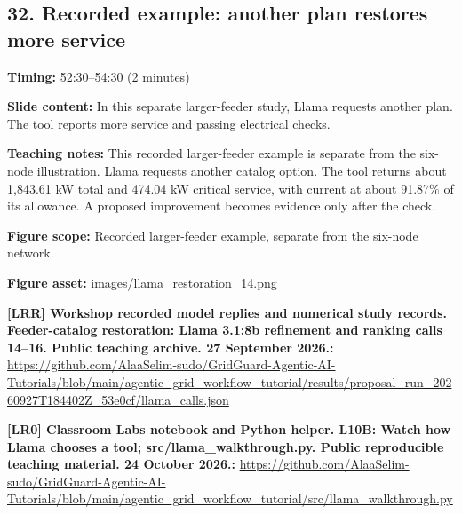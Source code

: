 \documentclass[10pt,letterpaper]{article}
\begin{document}
\subsection*{32. Recorded example: another plan restores more service}
\textbf{Timing:} 52:30--54:30 (2 minutes)\par
\textbf{Slide content:} In this separate larger-feeder study, Llama requests another plan.
The tool reports more service and passing electrical checks.\par
\textbf{Teaching notes:} This recorded larger-feeder example is separate from the six-node illustration. Llama requests another catalog option. The tool returns about 1,843.61 kW total and 474.04 kW critical service, with current at about 91.87\% of its allowance. A proposed improvement becomes evidence only after the check.\par
\textbf{Figure scope:} Recorded larger-feeder example, separate from the six-node network.\par
\textbf{Figure asset:} images/llama\_restoration\_14.png\par
\textbf{[LRR] Workshop recorded model replies and numerical study records. Feeder-catalog restoration: Llama 3.1:8b refinement and ranking calls 14--16. Public teaching archive. 27 September 2026.:} \href{https://github.com/AlaaSelim-sudo/GridGuard-Agentic-AI-Tutorials/blob/main/agentic_grid_workflow_tutorial/results/proposal_run_20260927T184402Z_53e0cf/llama_calls.json}{\small\ttfamily https:/\allowbreak{}/\allowbreak{}github.\allowbreak{}com/\allowbreak{}AlaaSelim-\allowbreak{}sudo/\allowbreak{}GridGuard-\allowbreak{}Agentic-\allowbreak{}AI-\allowbreak{}Tutorials/\allowbreak{}blob/\allowbreak{}main/\allowbreak{}agentic\_\allowbreak{}grid\_\allowbreak{}workflow\_\allowbreak{}tutorial/\allowbreak{}results/\allowbreak{}proposal\_\allowbreak{}run\_\allowbreak{}20260927T184402Z\_\allowbreak{}53e0cf/\allowbreak{}llama\_\allowbreak{}calls.\allowbreak{}json}\par
\textbf{[LR0] Classroom Labs notebook and Python helper. L10B: Watch how Llama chooses a tool; src/llama\_walkthrough.py. Public reproducible teaching material. 24 October 2026.:} \href{https://github.com/AlaaSelim-sudo/GridGuard-Agentic-AI-Tutorials/blob/main/agentic_grid_workflow_tutorial/src/llama_walkthrough.py}{\small\ttfamily https:/\allowbreak{}/\allowbreak{}github.\allowbreak{}com/\allowbreak{}AlaaSelim-\allowbreak{}sudo/\allowbreak{}GridGuard-\allowbreak{}Agentic-\allowbreak{}AI-\allowbreak{}Tutorials/\allowbreak{}blob/\allowbreak{}main/\allowbreak{}agentic\_\allowbreak{}grid\_\allowbreak{}workflow\_\allowbreak{}tutorial/\allowbreak{}src/\allowbreak{}llama\_\allowbreak{}walkthrough.\allowbreak{}py}\par
\par\medskip
\end{document}
